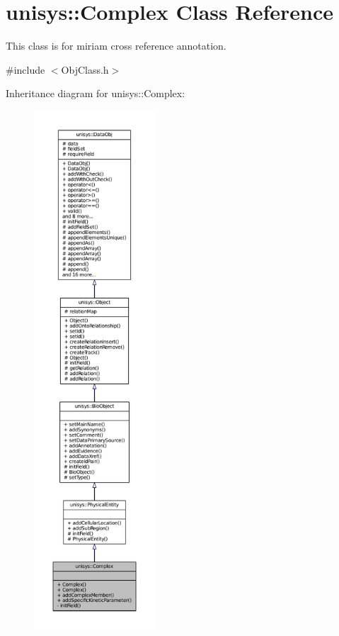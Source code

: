 \hypertarget{classunisys_1_1Complex}{\section{unisys\-:\-:Complex Class Reference}
\label{classunisys_1_1Complex}
}


This class is for miriam cross reference annotation.  




{\ttfamily \#include $<$Obj\-Class.\-h$>$}



Inheritance diagram for unisys\-:\-:Complex\-:
\nopagebreak
\begin{figure}[H]
\begin{center}
\leavevmode
\includegraphics[height=550pt]{classunisys_1_1Complex__inherit__graph}
\end{center}
\end{figure}


